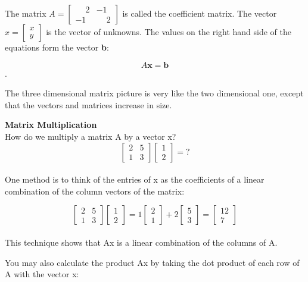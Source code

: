 \documentclass{ximera}
\begin{document}
\noindent
The matrix $A = \begin{bmatrix} \phantom{-}2 & -1\\-1 & \phantom{-}2 \end{bmatrix}$ is called the coefficient matrix. The vector $x = \begin{bmatrix} x\\y \end{bmatrix}$ is the vector of unknowns. The values on the right hand side of the
equations form the vector \textbf{b}:

\[A\textbf{x} = \textbf{b}\].

\noindent
The three dimensional matrix picture is very like the two dimensional one, except that the vectors and matrices increase in size.
\par

\noindent
\textbf{Matrix Multiplication}\\
How do we multiply a matrix A by a vector x?\\

\[\begin{bmatrix} 2 & 5\\ 1 & 3 \end{bmatrix} \begin{bmatrix} 1\\2 \end{bmatrix} = ?\]\\

\noindent
One method is to think of the entries of x as the coefficients of a linear combination of the column vectors of the matrix:

\[\begin{bmatrix} 2 & 5\\ 1 & 3 \end{bmatrix} \begin{bmatrix} 1\\2 \end{bmatrix} = 1\begin{bmatrix} 2\\1 \end{bmatrix} + 2 \begin{bmatrix} 5\\3 \end{bmatrix} = \begin{bmatrix} 12\\7 \end{bmatrix}\]\\

\noindent
This technique shows that Ax is a linear combination of the columns of A. \par 
\noindent
You may also calculate the product Ax by taking the dot product of each row of A with the vector x:
\end{document}
